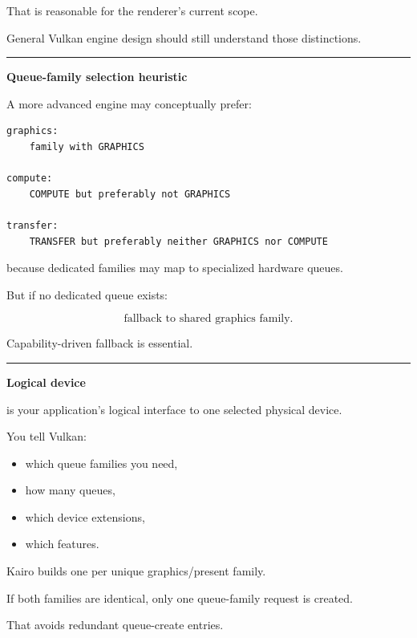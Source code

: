 That is reasonable for the renderer's current scope.

General Vulkan engine design should still understand those distinctions.

\begin{center}\rule{0.5\linewidth}{0.5pt}\end{center}

\textbf{Queue-family selection heuristic}

A more advanced engine may conceptually prefer:

\begin{verbatim}
graphics:
    family with GRAPHICS

compute:
    COMPUTE but preferably not GRAPHICS

transfer:
    TRANSFER but preferably neither GRAPHICS nor COMPUTE
\end{verbatim}

because dedicated families may map to specialized hardware queues.

But if no dedicated queue exists:

\[
\boxed{
\text{fallback to shared graphics family}.
}
\]

Capability-driven fallback is essential.

\begin{center}\rule{0.5\linewidth}{0.5pt}\end{center}

\textbf{Logical device}

 is your application's logical interface to one selected physical device.

You tell Vulkan:

\begin{itemize}
\tightlist
\item
  which queue families you need,
\item
  how many queues,
\item
  which device extensions,
\item
  which features.
\end{itemize}

Kairo builds one  per unique graphics/present family.

If both families are identical, only one queue-family request is created.

That avoids redundant queue-create entries.

